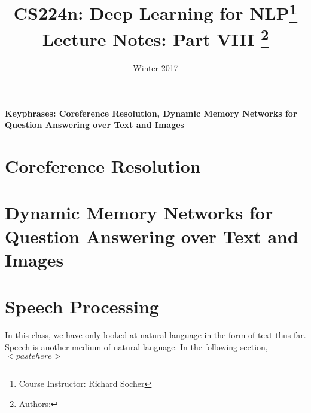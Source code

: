 \documentclass{tufte-handout}
\title{CS224n: Deep Learning for NLP\thanks{Course Instructor: Richard Socher} \\
       \Large Lecture Notes: Part VIII \thanks{Authors:}}
\date{Winter 2017} %
\begin{document}
\maketitle%



\textbf{Keyphrases: Coreference Resolution, Dynamic Memory Networks for Question Answering over Text and Images}

\section{Coreference Resolution}


\section{Dynamic Memory Networks for Question Answering over Text and Images}


\section{Speech Processing}
In this class, we have only looked at natural language in the form of text thus far. Speech is another medium of natural language. In the following section, $<paste here>$
\end{document}
